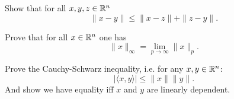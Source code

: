 \documentclass{ExerciseSheet}
\newif\ifsolutions
\begin{document}
\fi
\vskip 0.5cm
\begin{problem}
Show that for all $x,y,z \in \mathbb{R}^n$
\begin{equation*}
    \|x-y\| \leq \|x-z\| + \|z-y\|.
\end{equation*}
\end{problem}

\ifsolutions
\vskip 0.3cm

\begin{solution}
We simply use the triangle inequality 
\begin{equation*}
    \|x-y\| = \|x-z+z-y\| \leq \|x-z\| + \|z-y\|.
\end{equation*}
\end{solution}
\fi

\begin{exo}
Prove that for all $x\in \mathbb{R}^n$ one has
\begin{equation*}
    \|x\|_\infty = \lim_{p\rightarrow \infty} \|x\|_p.
\end{equation*}
\end{exo}

\ifsolutions
\vskip 0.3cm
\begin{solution}
Consider
\begin{align*}
    \lim_{p\rightarrow \infty} \|x\|_p &= \lim_{p\rightarrow \infty} \left(\sum_{i=1}^ n |x_i|^ p\right)^{1/p} = \lim_{p\rightarrow \infty} \left(\sum_{i=1}^n \|x\|^p_\infty\frac{|x_i|^p}{\|x\|^p_\infty}\right)^{1/p} \\
    &= \|x\|_\infty \lim_{p\rightarrow \infty} \left(\sum_{i=1}^n \frac{|x_i|^p}{\|x\|^p_\infty}\right)^{1/p}
\end{align*}
Now, as all the summands are bounded by one, we have that the $p-$th root converges to one. 
\end{solution}

\fi
\vskip 0.5cm

\begin{exo}
Prove the Cauchy-Schwarz inequality, i.e. for any $x,y \in \mathbb{R}^n$:
\begin{equation*}
    |\langle x, y \rangle | \leq \|x\| \|y\|.
\end{equation*}
And show we have equality iff $x$ and $y$ are linearly dependent. 
\end{exo} 
\end{document}
